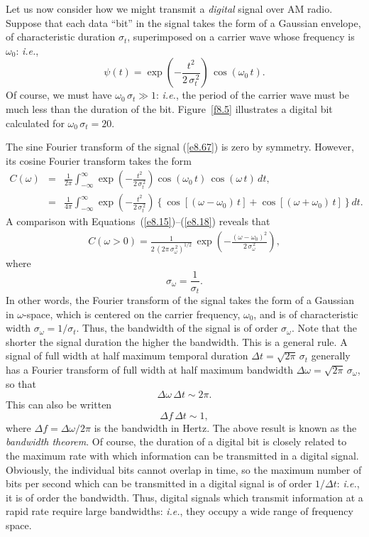 Let us now consider how we might transmit a {\em digital}\/ signal over AM radio. 
Suppose that each data ``bit'' in the signal takes the form of a Gaussian envelope,
of characteristic duration $\sigma_t$, superimposed on a
carrier wave whose frequency is $\omega_0$: {\em i.e.}, 
\begin{equation}\label{e8.67}
\psi(t) = \exp\left(-\frac{t^2}{2\,\sigma_t^{\,2}}\right)\,\cos(\omega_0\,t).
\end{equation}
Of course, we must have $\omega_0\,\sigma_t\gg 1$: {\em i.e.}, the period of the
carrier wave must be much less than the duration of the bit.
Figure~\ref{f8.5} illustrates  a digital bit calculated for $\omega_0\,\sigma_t=20$. 

The sine Fourier transform of the signal (\ref{e8.67}) is zero by symmetry. However,
its cosine Fourier transform takes the form
\begin{eqnarray}
C(\omega) &=&\frac{1}{2\pi}\int_{-\infty}^{\infty} \exp\left(-\frac{t^2}{2\,\sigma_t^{\,2}}\right)\cos(\omega_0\,t)\,\cos(\omega\,t)\,dt,\nonumber\\[0.5ex]
&=&\frac{1}{4\pi}\int_{-\infty}^\infty  \exp\left(-\frac{t^2}{2\,\sigma_t^{\,2}}\right)
\left\{\cos[(\omega-\omega_0)\,t] + \cos[(\omega+\omega_0)\,t]\right\}dt.
\end{eqnarray}
A comparison  with Equations~(\ref{e8.15})--(\ref{e8.18}) reveals that
\begin{eqnarray}
C(\omega>0) = \frac{1}{2\,(2\pi\,\sigma_\omega^{\,2})^{1/2}}\,\exp\left(-\frac{(\omega-\omega_0)^2}{2\,\sigma_\omega^{\,2}}\right),
\end{eqnarray}
where 
\begin{equation}
\sigma_\omega = \frac{1}{\sigma_t}.
\end{equation}
In other words, the Fourier transform of the signal takes the form of a Gaussian
in $\omega$-space, which is centered on the carrier frequency, $\omega_0$, and
is of characteristic width $\sigma_\omega=1/\sigma_t$. Thus, the bandwidth of
the signal is of order $\sigma_\omega$. Note that the shorter the signal duration
the higher the bandwidth. This is a general rule. A signal of full width at half maximum temporal duration $\Delta t=\sqrt{2\pi}\,\sigma_t$
generally has a Fourier transform of full width at half maximum bandwidth $\Delta \omega=\sqrt{2\pi}\,\sigma_\omega$, so that
\begin{equation}
\Delta\omega\,\Delta t\sim 2\pi.
\end{equation}
This can also be written
\begin{equation}
\Delta f\,\Delta t\sim 1,
\end{equation}
where $\Delta f=\Delta\omega/2\pi$ is the bandwidth in Hertz. 
The above result is known as the {\em bandwidth theorem}. Of course, the duration
of a digital bit is closely related to the maximum rate with which information
can be transmitted in a digital signal. Obviously, the individual bits cannot
overlap in time, so the maximum number of bits per second which can be transmitted 
in a digital signal is of order $1/\Delta t$: {\em i.e.},  it is of order the bandwidth.
Thus, digital signals which transmit information at a rapid rate require large bandwidths:
{\em i.e.}, they occupy a wide range of frequency space. 

